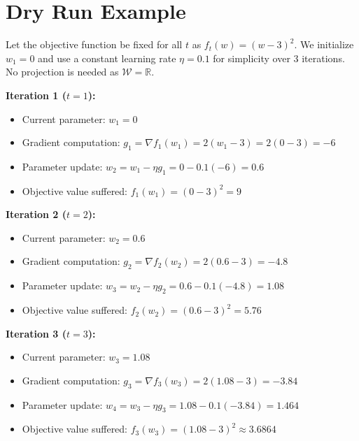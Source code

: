 \documentclass[12pt]{article}
\begin{document}
\section*{Dry Run Example}
Let the objective function be fixed for all $t$ as $f_t(w) = (w-3)^2$. We initialize $w_1 = 0$ and use a constant learning rate $\eta = 0.1$ for simplicity over 3 iterations. No projection is needed as $\mathcal{W} = \mathbb{R}$.

\textbf{Iteration 1 ($t=1$):}
\begin{itemize}
    \item Current parameter: $w_1 = 0$
    \item Gradient computation: $g_1 = \nabla f_1(w_1) = 2(w_1 - 3) = 2(0 - 3) = -6$
    \item Parameter update: $w_2 = w_1 - \eta g_1 = 0 - 0.1(-6) = 0.6$
    \item Objective value suffered: $f_1(w_1) = (0 - 3)^2 = 9$
\end{itemize}

\textbf{Iteration 2 ($t=2$):}
\begin{itemize}
    \item Current parameter: $w_2 = 0.6$
    \item Gradient computation: $g_2 = \nabla f_2(w_2) = 2(0.6 - 3) = -4.8$
    \item Parameter update: $w_3 = w_2 - \eta g_2 = 0.6 - 0.1(-4.8) = 1.08$
    \item Objective value suffered: $f_2(w_2) = (0.6 - 3)^2 = 5.76$
\end{itemize}

\textbf{Iteration 3 ($t=3$):}
\begin{itemize}
    \item Current parameter: $w_3 = 1.08$
    \item Gradient computation: $g_3 = \nabla f_3(w_3) = 2(1.08 - 3) = -3.84$
    \item Parameter update: $w_4 = w_3 - \eta g_3 = 1.08 - 0.1(-3.84) = 1.464$
    \item Objective value suffered: $f_3(w_3) = (1.08 - 3)^2 \approx 3.6864$
\end{itemize}
\end{document}
